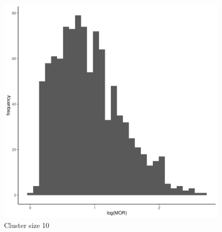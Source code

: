 \documentclass[
  letterpaper,
  DIV=11,
  numbers=noendperiod,
  titlepage]{scrartcl}
\begin{document}
\begin{figure}
\begin{minipage}[t]{0.24\linewidth}
{{\includegraphics{../../plots/two-lvl-ran-slope/low-prev/hist_30_10_two_lvl_slp_low_prev_q2.png}

}

\caption{Cluster size 10}

}

\end{minipage}%
%
\begin{minipage}[t]{0.24\linewidth}

{\centering 

}
\end{minipage}
\end{figure}
\end{document}
